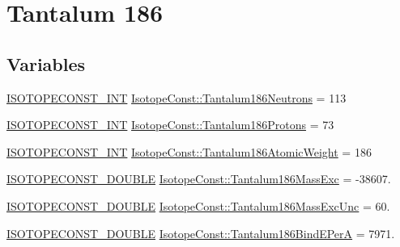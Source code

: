\hypertarget{group___isotope_const-_tantalum-_ta186}{}\section{Tantalum 186}
\label{group___isotope_const-_tantalum-_ta186}
\subsection*{Variables}
\begin{DoxyCompactItemize}
\item 
\mbox{\hyperlink{group___isotope_const-_macros_ga5f18360b3e99483a35c32d789e62621c}{I\+S\+O\+T\+O\+P\+E\+C\+O\+N\+S\+T\+\_\+\+I\+NT}} \mbox{\hyperlink{group___isotope_const-_tantalum-_ta186_ga097eac9a31ec1bc0b96ecb401344ef9b}{Isotope\+Const\+::\+Tantalum186\+Neutrons}} = 113
\item 
\mbox{\hyperlink{group___isotope_const-_macros_ga5f18360b3e99483a35c32d789e62621c}{I\+S\+O\+T\+O\+P\+E\+C\+O\+N\+S\+T\+\_\+\+I\+NT}} \mbox{\hyperlink{group___isotope_const-_tantalum-_ta186_gaed2de6d25ca00e4ec86fc85c555ce2bf}{Isotope\+Const\+::\+Tantalum186\+Protons}} = 73
\item 
\mbox{\hyperlink{group___isotope_const-_macros_ga5f18360b3e99483a35c32d789e62621c}{I\+S\+O\+T\+O\+P\+E\+C\+O\+N\+S\+T\+\_\+\+I\+NT}} \mbox{\hyperlink{group___isotope_const-_tantalum-_ta186_gaa72bf390f9e37f3aa5d1f9f12b46a0de}{Isotope\+Const\+::\+Tantalum186\+Atomic\+Weight}} = 186
\item 
\mbox{\hyperlink{group___isotope_const-_macros_ga8f45a7272ce02c0b4c65c44636ed719a}{I\+S\+O\+T\+O\+P\+E\+C\+O\+N\+S\+T\+\_\+\+D\+O\+U\+B\+LE}} \mbox{\hyperlink{group___isotope_const-_tantalum-_ta186_ga45af1528825550db2df9a0dfa6a88ef9}{Isotope\+Const\+::\+Tantalum186\+Mass\+Exc}} = -\/38607.
\item 
\mbox{\hyperlink{group___isotope_const-_macros_ga8f45a7272ce02c0b4c65c44636ed719a}{I\+S\+O\+T\+O\+P\+E\+C\+O\+N\+S\+T\+\_\+\+D\+O\+U\+B\+LE}} \mbox{\hyperlink{group___isotope_const-_tantalum-_ta186_ga2670b336022b087eef66c84778c5a14d}{Isotope\+Const\+::\+Tantalum186\+Mass\+Exc\+Unc}} = 60.
\item 
\mbox{\hyperlink{group___isotope_const-_macros_ga8f45a7272ce02c0b4c65c44636ed719a}{I\+S\+O\+T\+O\+P\+E\+C\+O\+N\+S\+T\+\_\+\+D\+O\+U\+B\+LE}} \mbox{\hyperlink{group___isotope_const-_tantalum-_ta186_ga4c6de951f1524d1f84997eb36cf67fec}{Isotope\+Const\+::\+Tantalum186\+Bind\+E\+PerA}} = 7971.
\item 

\end{DoxyCompactItemize}
